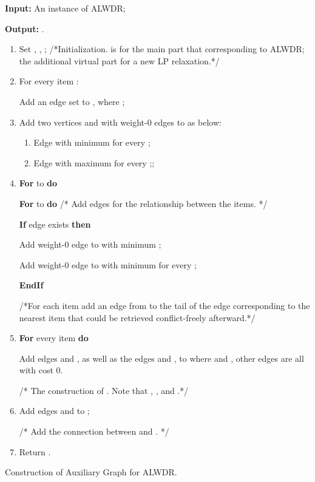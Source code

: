 \documentclass[11pt,english,onecolumn,draftcls]{IEEEtran}
\theoremstyle{plain}
\theoremstyle{plain}
\theoremstyle{plain}
\theoremstyle{plain}
\begin{document}
\begin{algorithm}
\textbf{Input: }An instance of ALWDR;

\textbf{Output:} .
\begin{enumerate}
\item Set , , ; /{*}Initialization.
 is for the main part that corresponding to ALWDR;
 the additional virtual part for a new LP relaxation.{*}/
\item For every item :


\textbf{\quad{}}Add an edge set 
to , where ;

\item Add two vertices  and  with weight-0 edges to  as
below:

\begin{enumerate}
\item Edge  with minimum  for every ;
\item Edge  with maximum  for every ;;
\end{enumerate}
\item \textbf{For}  to  \textbf{do}


\textbf{\quad{}For}  to  \textbf{do \quad{}}/{*} Add edges
for the relationship between the items. {*}/


\textbf{\quad{}\quad{}If} edge  exists
\textbf{then}


\textbf{\quad{}\quad{}\quad{}}Add weight-0 edge 
to  with minimum ;


\textbf{\quad{}\quad{}\quad{}}Add weight-0 edge 
to  with minimum  for every ;


\textbf{\quad{}\quad{}EndIf}


/{*}For each item add an edge from  to the tail of the
edge corresponding to the nearest item that could be retrieved conflict-freely
afterward.{*}/

\item \textbf{For} every item  \textbf{do}


\textbf{\quad{}}Add edges  and ,
as well as the edges  and ,
to  where  and , other edges
are all with cost 0.


/{*} The construction of . Note that ,
, and .{*}/

\item Add edges  and  to ;


/{*} Add the connection between  and . {*}/

\item Return .
\end{enumerate}
\protect\caption{\label{alg:RefinedConstruction}Construction of Auxiliary Graph for
ALWDR. }
\end{algorithm}
\end{document}
